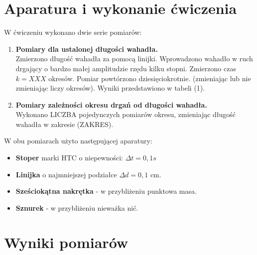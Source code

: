 \documentclass{article}
\begin{document}
\section{Aparatura i wykonanie ćwiczenia}
	W ćwiczeniu wykonano dwie serie pomiarów:
	\begin{enumerate}%
		\item \textbf{Pomiary dla ustalonej długości wahadła.}\\
			Zmierzono długość wahadła za pomocą linijki. Wprowadzono wahadło w ruch drgający o bardzo małej amplitudzie rzędu kilku stopni. Zmierzono czas $k= XXX$ okresów. Pomiar powtórzono dziesięciokrotnie. (zmieniając lub nie zmieniając liczy okresów). Wyniki przedstawiono w tabeli (1).
		\item \textbf{Pomiary zależności okresu drgań od długości wahadła.}\\
			Wykonano LICZBA pojedynczych pomiarów okresu, zmieniając długość wahadła w zakresie (ZAKRES).
	\end{enumerate}
	W obu pomiarach użyto następującej aparatury:
	\begin{itemize} %
		\item \textbf{Stoper} marki HTC o niepewności: $\Delta t = 0,1s$
		\item \textbf{Linijka} o najmniejszej podziałce $\Delta d = 0,1$ cm.
		\item \textbf{Sześciokątna nakrętka} - w przybliżeniu punktowa masa.
		\item \textbf{Sznurek} - w przybliżeniu nieważka nić. %
	\end{itemize}
	
\newpage

\section{Wyniki pomiarów}
\end{document}
